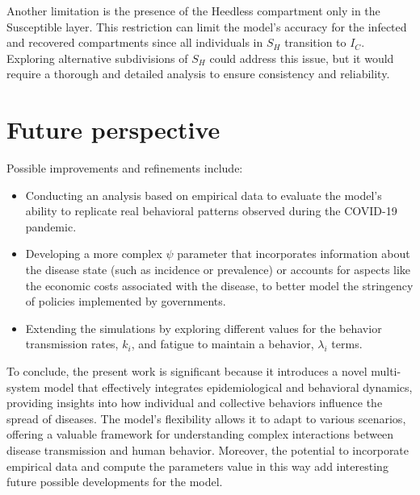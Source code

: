 Another limitation is the presence of the Heedless compartment only in the Susceptible layer. This restriction can limit the model's accuracy for the infected and recovered compartments since all individuals in $S_H$ transition to $I_C$. Exploring alternative subdivisions of $S_H$ could address this issue, but it would require a thorough and detailed analysis to ensure consistency and reliability.



\section{Future perspective}

Possible improvements and refinements include:
\begin{itemize}
	\item Conducting an analysis based on empirical data to evaluate the model's ability to replicate real behavioral patterns observed during the COVID-19 pandemic.
	\item Developing a more complex $\psi$ parameter that incorporates information about the disease state (such as incidence or prevalence) or accounts for aspects like the economic costs associated with the disease, to better model the stringency of policies implemented by governments.
	\item Extending the simulations by exploring different values for the behavior transmission rates, $k_i$, and fatigue to maintain a behavior, $\lambda_i$ terms.\\
\end{itemize}


\noindent To conclude, the present work is significant because it introduces a novel multi-system model that effectively integrates epidemiological and behavioral dynamics, providing insights into how individual and collective behaviors influence the spread of diseases. The model's flexibility allows it to adapt to various scenarios, offering a valuable framework for understanding complex interactions between disease transmission and human behavior. Moreover, the potential to incorporate empirical data and compute the parameters value in this way add interesting future possible developments for the model.